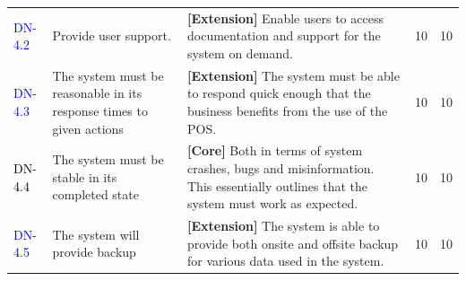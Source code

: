 \documentclass[a4paper]{article}
\begin{document}
\begin{longtable}{|l|p{5cm}|p{7cm}|p{0.5cm}|p{0.5cm}|}
  \textcolor{blue} {DN-4.2} &  Provide user support. & \textbf{[Extension] }Enable users to access documentation and support for the system on demand. & 10 & 10\\
  \textcolor{blue} {DN-4.3} &  The system must be reasonable in its response times to given actions & \textbf{[Extension] }The system must be able to respond quick enough that the business benefits from the use of the POS. & 10 & 10\\
  \textcolor{black} {DN-4.4} & The system must be stable in its completed state & \textbf{[Core] }Both in terms of system crashes, bugs and misinformation. This essentially outlines that the system must work as expected. & 10 & 10\\
\textcolor{blue}{DN-4.5} & The system will provide backup & \textbf{[Extension] }The system is able to provide both onsite and offsite backup for various data used in the system. & 10 & 10\\
  \hline
\end{longtable}

\pagebreak
\end{document}
